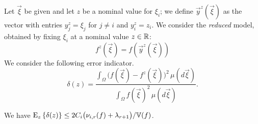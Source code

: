 Let $\vec\xi$ be given and let $z$ be a nominal value for $\xi_i$;  we define 
$\vec{y}^z(\vec\xi)$ as the vector with entries $y^z_j = \xi_j$ for $j \neq i$
and $y^z_i = z_i$.
We consider the \emph{reduced} model, 
obtained by fixing $\xi_i$ at a nominal value $z \in \R$: 
\[
f^{z}(\vec\xi) = f(\vec{y}^z(\vec\xi))
\] 
We consider the following error indicator.
\[
\delta(z) =
\frac{ \int_\Omega \big( f(\vec\xi) - f^{z}(\vec\xi)\big)^2 \, \mu(d\vec\xi) }
          {\int_\Omega f(\vec\xi)^2 \, \mu(d\vec\xi)}.
\] 

\begin{theorem}
We have $\Ez{ \delta(z)} \leq 2C_i\big(\act{f}{i}{r} + \lambda_{r+1}\big)/{\V(f)} $.
\end{theorem}
%



